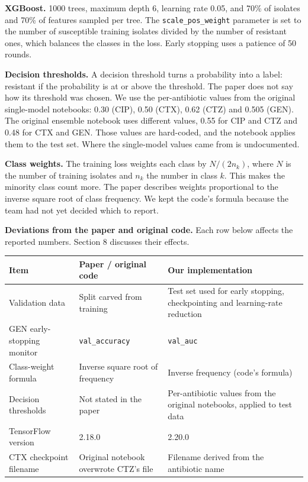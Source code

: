 \documentclass[11pt]{article}
\begin{document}
\textbf{XGBoost.} 1000 trees, maximum depth 6, learning rate 0.05, and 70\% of isolates and 70\% of features sampled per tree. The \texttt{scale\_pos\_weight} parameter is set to the number of susceptible training isolates divided by the number of resistant ones, which balances the classes in the loss. Early stopping uses a patience of 50 rounds.

\textbf{Decision thresholds.} A decision threshold turns a probability into a label: resistant if the probability is at or above the threshold. The paper does not say how its threshold was chosen. We use the per-antibiotic values from the original single-model notebooks: 0.30 (CIP), 0.50 (CTX), 0.62 (CTZ) and 0.505 (GEN). The original ensemble notebook uses different values, 0.55 for CIP and CTZ and 0.48 for CTX and GEN. Those values are hard-coded, and the notebook applies them to the test set. Where the single-model values came from is undocumented.

\textbf{Class weights.} The training loss weights each class by $N / (2 n_k)$, where $N$ is the number of training isolates and $n_k$ the number in class $k$. This makes the minority class count more. The paper describes weights proportional to the inverse square root of class frequency. We kept the code's formula because the team had not yet decided which to report.

\textbf{Deviations from the paper and original code.} Each row below affects the reported numbers. Section 8 discusses their effects.

\begin{center}
\begin{tabular}{p{3.6cm}p{4.6cm}p{5.6cm}}
\toprule
\textbf{Item} & \textbf{Paper / original code} & \textbf{Our implementation} \\
\midrule
Validation data & Split carved from training & Test set used for early stopping, checkpointing and learning-rate reduction \\
GEN early-stopping monitor & \texttt{val\_accuracy} & \texttt{val\_auc} \\
Class-weight formula & Inverse square root of frequency & Inverse frequency (code's formula) \\
Decision thresholds & Not stated in the paper & Per-antibiotic values from the original notebooks, applied to test data \\
TensorFlow version & 2.18.0 & 2.20.0 \\
CTX checkpoint filename & Original notebook overwrote CTZ's file & Filename derived from the antibiotic name \\
\bottomrule
\end{tabular}
\end{center}
\end{document}
